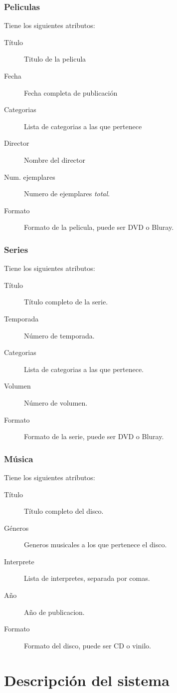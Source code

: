 \documentclass[11pt,a4paper]{article}
\begin{document}
\subsubsection{Peliculas}
Tiene los siguientes atributos:
\begin{description}
	\item[Título] Titulo de la pelicula
	\item[Fecha] Fecha completa de publicación 
	\item[Categorias] Lista de categorias a las que pertenece
	\item[Director] Nombre del director
	\item[Num. ejemplares] Numero de ejemplares \emph{total}.
	\item[Formato] Formato de la pelicula, puede ser DVD o Bluray.
\end{description}

\subsubsection{Series}
Tiene los siguientes atributos:
\begin{description}
	\item[Título] Título completo de la serie.
	\item[Temporada] Número de temporada.
	\item[Categorias] Lista de categorias a las que pertenece.
	\item[Volumen] Número de volumen. 
	\item[Formato] Formato de la serie, puede ser DVD o Bluray.
\end{description}


\subsubsection{Música}
Tiene los siguientes atributos:
\begin{description}
	\item[Título] Título completo del disco.
	\item[Géneros] Generos musicales a los que pertenece el disco.
	\item[Interprete] Lista de interpretes, separada por comas.
	\item[Año] Año de publicacion.
	\item[Formato] Formato del disco, puede ser CD o vinilo.
\end{description}

\section{Descripción del sistema}
\end{document}
